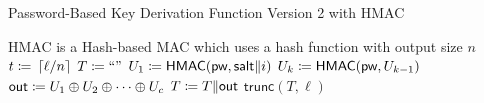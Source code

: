 \begin{algorithm}[t]
\caption{Password-Based Key Derivation Function Version 2 with \textsf{HMAC}}
\label{alg:pbkdf2}
\begin{algorithmic}[1]
\Require \textsf{HMAC} is a Hash-based MAC
    which uses a hash function with output size $n$
    \State $t \coloneqq{} \left\lceil \ell/n \right\rceil$
    \State $T \coloneqq{} \text{``''}$
        \State $U_{1} \coloneqq{} 
            \textsf{HMAC}(\textsf{pw}, \textsf{salt}\|i)$
            \State $U_{k} \coloneqq{} 
                \textsf{HMAC}(\textsf{pw}, U_{k-1})$
        \EndFor
        \State $\textsf{out} \coloneqq{}
            U_{1} \oplus U_{2} \oplus \cdots \oplus U_{c}$
        \State $T \coloneqq{} T\|\textsf{out}$
    \EndFor
    \State \Return $\textsf{trunc}(T, \ell)$
\EndProcedure
\end{algorithmic}
\end{algorithm}
